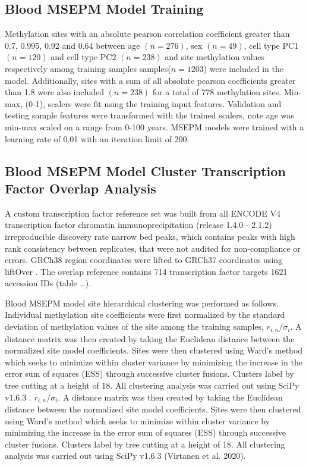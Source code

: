 \documentclass{article}
\begin{document}
{\begin{linenumbers}
\subsection{Blood MSEPM Model Training}

Methylation sites with an absolute pearson correlation coefficient greater than 0.7, 0.995, 0.92 and 0.64 between 
age $(n=276)$, sex $(n=49)$, cell type PC1 $(n=120)$ and cell type PC2 $(n=238)$ and site methylation values 
respectively among training samples samples($n=1203$) were included in the model. Additionally, sites with a 
sum of all absolute pearson coefficients greater than 1.8 were also included $(n=238)$ for a total of 778 
methylation sites. Min-max, (0-1), scalers were fit using the training input features. Validation and testing 
sample features were transformed with the trained scalers, note age was min-max scaled on a range from 0-100 
years. MSEPM models were trained with a learning rate of 0.01 with an iteration limit of 200. 	

\subsection{Blood MSEPM Model Cluster Transcription Factor Overlap Analysis}

A custom transcription factor reference set was built from all ENCODE V4 transcription factor chromatin 
immunoprecipitation \cite{ENCODE_Project_Consortium2012-oe,Davis2018-ha} (release 1.4.0 - 2.1.2)  
irreproducible discovery rate narrow bed peaks, which contains peaks with high rank consistency between 
replicates, that were not audited for non-compliance or errors. GRCh38 region coordinates were 
lifted to GRCh37 coordinates using liftOver \cite{Hinrichs2006-oq}. The overlap reference contains 714 
transcription factor targets 1621 accession IDs (table …). 

Blood MSEPM model site hierarchical clustering was performed as follows. Individual methylation site coefficients 
were first normalized by the standard deviation of methylation values of the site among the training samples, 
$r_{i,n} / \sigma_{i}$. A distance matrix was then created by taking the Euclidean distance between the 
normalized site model coefficients. Sites were then clustered using Ward's method which seeks to minimize 
within cluster variance by minimizing the increase in the error sum of squares (ESS) through successive 
cluster fusions.  Clusters label by tree cutting at a height of 18. All clustering analysis was carried out 
using SciPy v1.6.3 \cite{Virtanen2020-mm}.  $r_{i,n} / \sigma_{i}$. A distance matrix was then created by 
taking the Euclidean distance between the normalized site model coefficients. Sites were then clustered using 
Ward’s method which seeks to minimize within cluster variance by minimizing the increase in the error sum of 
squares (ESS) through successive cluster fusions.  Clusters label by tree cutting at a height of 18. All 
clustering analysis was carried out using SciPy v1.6.3 (Virtanen et al. 2020).  


\end{linenumbers}}
\end{document}
